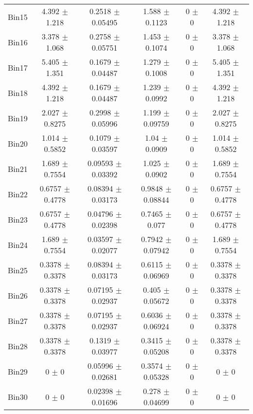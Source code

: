 \begin{tabular}{@{\extracolsep{4pt}}lccccc@{}}
     Bin15 & 4.392 $\pm$ 1.218 & 0.2518 $\pm$ 0.05495 & 1.588 $\pm$ 0.1123 & 0 $\pm$ 0 & 4.392 $\pm$ 1.218 \\ 
     Bin16 & 3.378 $\pm$ 1.068 & 0.2758 $\pm$ 0.05751 & 1.453 $\pm$ 0.1074 & 0 $\pm$ 0 & 3.378 $\pm$ 1.068 \\ 
     Bin17 & 5.405 $\pm$ 1.351 & 0.1679 $\pm$ 0.04487 & 1.279 $\pm$ 0.1008 & 0 $\pm$ 0 & 5.405 $\pm$ 1.351 \\ 
     Bin18 & 4.392 $\pm$ 1.218 & 0.1679 $\pm$ 0.04487 & 1.239 $\pm$ 0.0992 & 0 $\pm$ 0 & 4.392 $\pm$ 1.218 \\ 
     Bin19 & 2.027 $\pm$ 0.8275 & 0.2998 $\pm$ 0.05996 & 1.199 $\pm$ 0.09759 & 0 $\pm$ 0 & 2.027 $\pm$ 0.8275 \\ 
     Bin20 & 1.014 $\pm$ 0.5852 & 0.1079 $\pm$ 0.03597 & 1.04 $\pm$ 0.0909 & 0 $\pm$ 0 & 1.014 $\pm$ 0.5852 \\ 
     Bin21 & 1.689 $\pm$ 0.7554 & 0.09593 $\pm$ 0.03392 & 1.025 $\pm$ 0.0902 & 0 $\pm$ 0 & 1.689 $\pm$ 0.7554 \\ 
     Bin22 & 0.6757 $\pm$ 0.4778 & 0.08394 $\pm$ 0.03173 & 0.9848 $\pm$ 0.08844 & 0 $\pm$ 0 & 0.6757 $\pm$ 0.4778 \\ 
     Bin23 & 0.6757 $\pm$ 0.4778 & 0.04796 $\pm$ 0.02398 & 0.7465 $\pm$ 0.077 & 0 $\pm$ 0 & 0.6757 $\pm$ 0.4778 \\ 
     Bin24 & 1.689 $\pm$ 0.7554 & 0.03597 $\pm$ 0.02077 & 0.7942 $\pm$ 0.07942 & 0 $\pm$ 0 & 1.689 $\pm$ 0.7554 \\ 
     Bin25 & 0.3378 $\pm$ 0.3378 & 0.08394 $\pm$ 0.03173 & 0.6115 $\pm$ 0.06969 & 0 $\pm$ 0 & 0.3378 $\pm$ 0.3378 \\ 
     Bin26 & 0.3378 $\pm$ 0.3378 & 0.07195 $\pm$ 0.02937 & 0.405 $\pm$ 0.05672 & 0 $\pm$ 0 & 0.3378 $\pm$ 0.3378 \\ 
     Bin27 & 0.3378 $\pm$ 0.3378 & 0.07195 $\pm$ 0.02937 & 0.6036 $\pm$ 0.06924 & 0 $\pm$ 0 & 0.3378 $\pm$ 0.3378 \\ 
     Bin28 & 0.3378 $\pm$ 0.3378 & 0.1319 $\pm$ 0.03977 & 0.3415 $\pm$ 0.05208 & 0 $\pm$ 0 & 0.3378 $\pm$ 0.3378 \\ 
     Bin29 & 0 $\pm$ 0 & 0.05996 $\pm$ 0.02681 & 0.3574 $\pm$ 0.05328 & 0 $\pm$ 0 & 0 $\pm$ 0 \\ 
     Bin30 & 0 $\pm$ 0 & 0.02398 $\pm$ 0.01696 & 0.278 $\pm$ 0.04699 & 0 $\pm$ 0 & 0 $\pm$ 0 \\ 
\hline\hline
  \end{tabular}
